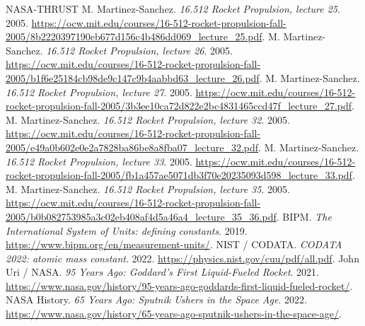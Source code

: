 \begin{thebibliography}{NASA-THRUST}
 M. Martinez-Sanchez. \emph{16.512 Rocket Propulsion, lecture 25}. 2005. \url{https://ocw.mit.edu/courses/16-512-rocket-propulsion-fall-2005/8b2220397190eb677d156c4b486dd069_lecture_25.pdf}.
 M. Martinez-Sanchez. \emph{16.512 Rocket Propulsion, lecture 26}. 2005. \url{https://ocw.mit.edu/courses/16-512-rocket-propulsion-fall-2005/b1f6e25184cb98de9c147c9b4aabbd63_lecture_26.pdf}.
 M. Martinez-Sanchez. \emph{16.512 Rocket Propulsion, lecture 27}. 2005. \url{https://ocw.mit.edu/courses/16-512-rocket-propulsion-fall-2005/3b3ee10ca72d822e2bc4831465ccd47f_lecture_27.pdf}.
 M. Martinez-Sanchez. \emph{16.512 Rocket Propulsion, lecture 32}. 2005. \url{https://ocw.mit.edu/courses/16-512-rocket-propulsion-fall-2005/e49a0b602e0e2a7828ba86be8a8fba07_lecture_32.pdf}.
 M. Martinez-Sanchez. \emph{16.512 Rocket Propulsion, lecture 33}. 2005. \url{https://ocw.mit.edu/courses/16-512-rocket-propulsion-fall-2005/fb1a457ae5071db3f70e20235093d598_lecture_33.pdf}.
 M. Martinez-Sanchez. \emph{16.512 Rocket Propulsion, lecture 35}. 2005. \url{https://ocw.mit.edu/courses/16-512-rocket-propulsion-fall-2005/b0b082753985a3c02eb408af4d5a46a4_lecture_35_36.pdf}.
 BIPM. \emph{The International System of Units: defining constants}. 2019. \url{https://www.bipm.org/en/measurement-units/}.
 NIST / CODATA. \emph{CODATA 2022: atomic mass constant}. 2022. \url{https://physics.nist.gov/cuu/pdf/all.pdf}.
 John Uri / NASA. \emph{95 Years Ago: Goddard’s First Liquid-Fueled Rocket}. 2021. \url{https://www.nasa.gov/history/95-years-ago-goddards-first-liquid-fueled-rocket/}.
 NASA History. \emph{65 Years Ago: Sputnik Ushers in the Space Age}. 2022. \url{https://www.nasa.gov/history/65-years-ago-sputnik-ushers-in-the-space-age/}.
\end{thebibliography}\endgroup

